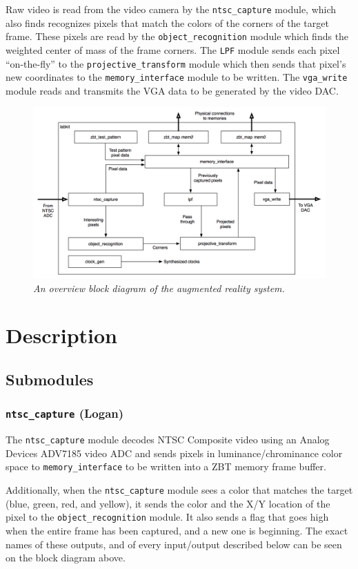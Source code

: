 \documentclass[10pt]{article}
\begin{document}
Raw video is read from the video camera by the {\tt ntsc\_capture} module, which also finds recognizes pixels that match the colors of the corners of the target frame. These pixels are read by the {\tt object\_recognition} module which finds the weighted center of mass of the frame corners. The {\tt LPF} module sends each pixel ``on-the-fly'' to the {\tt projective\_transform} module which then sends that pixel's new coordinates to the {\tt memory\_interface} module to be written. The {\tt vga\_write} module reads and transmits the VGA data to be generated by the video DAC.

\begin{figure}[h!]
\centering
\includegraphics[width=\textwidth]{images/simplified_block_diagram.png}
\caption{\emph{An overview block diagram of the augmented reality system.}}
\end{figure}

\section{Description}

\subsection{Submodules}

\subsubsection{{\tt ntsc\_capture} (Logan)}
The {\tt ntsc\_capture} module decodes NTSC Composite video using an Analog Devices ADV7185 video ADC and sends pixels in luminance/chrominance color space to {\tt memory\_interface} to be written into a ZBT memory frame buffer.

Additionally, when the {\tt ntsc\_capture} module sees a color that matches the target (blue, green, red, and yellow), it sends the color and the X/Y location of the pixel to the {\tt object\_recognition} module. It also sends a flag that goes high when the entire frame has been captured, and a new one is beginning. The exact names of these outputs, and of every input/output described below can be seen on the block diagram above.
\end{document}
